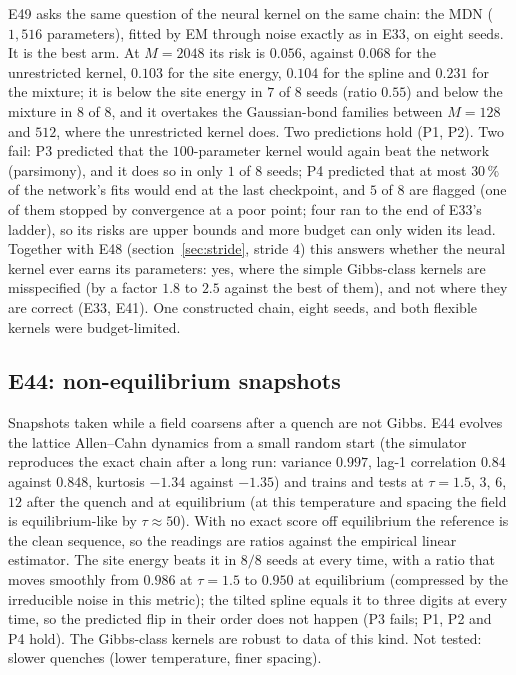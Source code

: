 \documentclass[10pt,a4paper]{article}
\theoremstyle{plain}
\theoremstyle{remark}
\begin{document}
E49 asks the same question of the neural kernel on the same chain: the MDN ($1{,}516$ parameters), fitted by EM through noise exactly as in E33, on eight seeds. It is the best arm. At $M=2048$ its risk is $0.056$, against $0.068$ for the unrestricted kernel, $0.103$ for the site energy, $0.104$ for the spline and $0.231$ for the mixture; it is below the site energy in $7$ of $8$ seeds (ratio $0.55$) and below the mixture in $8$ of $8$, and it overtakes the Gaussian-bond families between $M=128$ and $512$, where the unrestricted kernel does. Two predictions hold (P1, P2). Two fail: P3 predicted that the $100$-parameter kernel would again beat the network (parsimony), and it does so in only $1$ of $8$ seeds; P4 predicted that at most $30\,\%$ of the network's fits would end at the last checkpoint, and $5$ of $8$ are flagged (one of them stopped by convergence at a poor point; four ran to the end of E33's ladder), so its risks are upper bounds and more budget can only widen its lead. Together with E48 (section~\ref{sec:stride}, stride $4$) this answers whether the neural kernel ever earns its parameters: yes, where the simple Gibbs-class kernels are misspecified (by a factor $1.8$ to $2.5$ against the best of them), and not where they are correct (E33, E41). One constructed chain, eight seeds, and both flexible kernels were budget-limited.

\subsection{E44: non-equilibrium snapshots}

Snapshots taken while a field coarsens after a quench are not Gibbs. E44 evolves the lattice Allen--Cahn dynamics from a small random start (the simulator reproduces the exact chain after a long run: variance $0.997$, lag-1 correlation $0.84$ against $0.848$, kurtosis $-1.34$ against $-1.35$) and trains and tests at $\tau=1.5$, $3$, $6$, $12$ after the quench and at equilibrium
(at this temperature and spacing the field is equilibrium-like by $\tau\approx50$). With no exact score off equilibrium the reference is the clean sequence, so the readings are ratios against the empirical linear estimator. The site energy beats it in $8/8$ seeds at every time, with a ratio that moves smoothly from $0.986$ at $\tau=1.5$ to $0.950$ at equilibrium (compressed by the irreducible noise in this metric);
the tilted spline equals it to three digits at every time, so the predicted flip in their order does not happen (P3 fails; P1, P2 and P4 hold). The Gibbs-class kernels are robust to data of this kind. Not tested: slower quenches (lower temperature, finer spacing).
\end{document}
